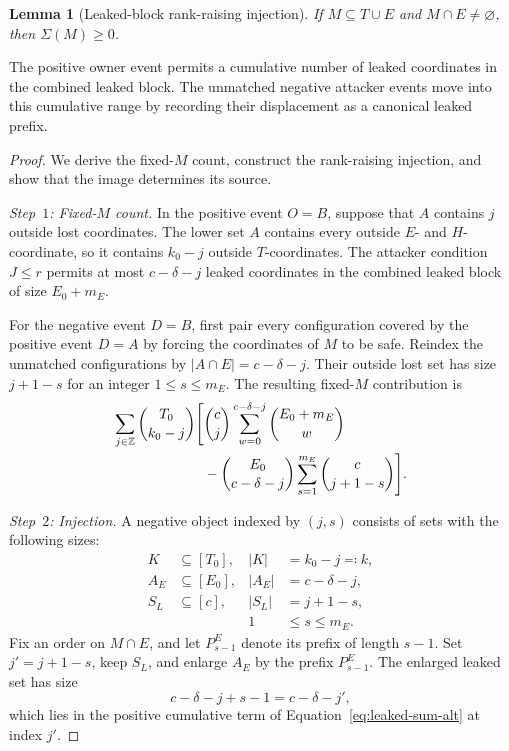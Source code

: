 \documentclass[11pt]{article}
\newtheorem{lemma}[theorem]{Lemma}
\begin{document}
\begin{lemma}[Leaked-block rank-raising injection]\label{lem:leaked-injection}
If ${M\subseteq T\cup E}$ and ${M\cap E\neq\varnothing}$, then ${\Sigma(M)\geq0}$.
\end{lemma}

The positive owner event permits a cumulative number of leaked coordinates in the combined leaked block.
The unmatched negative attacker events move into this cumulative range by recording their displacement as a canonical leaked prefix.

\begin{proof}
We derive the fixed-$M$ count, construct the rank-raising injection, and show that the image determines its source.

\emph{Step~$1$: Fixed-$M$ count.}
In the positive event ${O=B}$, suppose that $A$ contains $j$ outside lost coordinates.
The lower set $A$ contains every outside $E$- and $H$-coordinate, so it contains $k_0-j$ outside $T$-coordinates.
The attacker condition ${J\leq r}$ permits at most $c-\delta-j$ leaked coordinates in the combined leaked block of size $E_0+m_E$.

For the negative event ${D=B}$, first pair every configuration covered by the positive event ${D=A}$ by forcing the coordinates of $M$ to be safe.
Reindex the unmatched configurations by ${|A\cap E|=c-\delta-j}$.
Their outside lost set has size $j+1-s$ for an integer ${1\leq s\leq m_E}$.
The resulting fixed-$M$ contribution is
\begin{align}
\sum_{j\in\mathbb Z}\binom{T_0}{k_0-j}
\Bigg[
&\binom cj\sum_{w=0}^{c-\delta-j}\binom{E_0+m_E}{w}\notag\\
&-\binom{E_0}{c-\delta-j}
\sum_{s=1}^{m_E}\binom c{j+1-s}
\Bigg].
\label{eq:leaked-sum-alt}
\end{align}

\emph{Step~$2$: Injection.}
A negative object indexed by $(j,s)$ consists of sets with the following sizes:
\begin{align*}
K&\subseteq[T_0], & |K|&=k_0-j\eqqcolon k,\\
A_E&\subseteq[E_0], & |A_E|&=c-\delta-j,\\
S_L&\subseteq[c], & |S_L|&=j+1-s,\\
&&1&\leq s\leq m_E.
\end{align*}
Fix an order on $M\cap E$, and let $P_{s-1}^E$ denote its prefix of length $s-1$.
Set ${j'=j+1-s}$, keep $S_L$, and enlarge $A_E$ by the prefix $P_{s-1}^E$.
The enlarged leaked set has size
\begin{equation*}
c-\delta-j+s-1=c-\delta-j',
\end{equation*}
which lies in the positive cumulative term of Equation~\eqref{eq:leaked-sum-alt} at index $j'$.


\end{proof}
\end{document}
